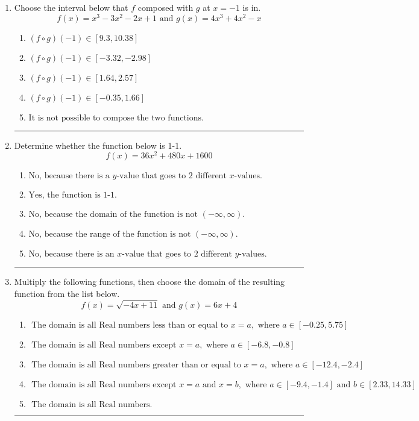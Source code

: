 \documentclass[14pt]{extbook}
\newcommand{\litem}[1]{\item#1\hspace*{-1cm}\rule{\textwidth}{0.4pt}}
\begin{document}
\begin{enumerate}
\litem{
Choose the interval below that $f$ composed with $g$ at $x=-1$ is in.\[ f(x) = x^{3} -3 x^{2} -2 x + 1 \text{ and } g(x) = 4x^{3} +4 x^{2} -x \]\begin{enumerate}[label=\Alph*.]
\item \( (f \circ g)(-1) \in [9.3, 10.38] \)
\item \( (f \circ g)(-1) \in [-3.32, -2.98] \)
\item \( (f \circ g)(-1) \in [1.64, 2.57] \)
\item \( (f \circ g)(-1) \in [-0.35, 1.66] \)
\item \( \text{It is not possible to compose the two functions.} \)

\end{enumerate} }
\litem{
Determine whether the function below is 1-1.\[ f(x) = 36 x^2 + 480 x + 1600 \]\begin{enumerate}[label=\Alph*.]
\item \( \text{No, because there is a $y$-value that goes to 2 different $x$-values.} \)
\item \( \text{Yes, the function is 1-1.} \)
\item \( \text{No, because the domain of the function is not $(-\infty, \infty)$.} \)
\item \( \text{No, because the range of the function is not $(-\infty, \infty)$.} \)
\item \( \text{No, because there is an $x$-value that goes to 2 different $y$-values.} \)

\end{enumerate} }
\litem{
Multiply the following functions, then choose the domain of the resulting function from the list below.\[ f(x) = \sqrt{-4x+11}  \text{ and } g(x) = 6x + 4 \]\begin{enumerate}[label=\Alph*.]
\item \( \text{ The domain is all Real numbers less than or equal to } x = a, \text{ where } a \in [-0.25, 5.75] \)
\item \( \text{ The domain is all Real numbers except } x = a, \text{ where } a \in [-6.8, -0.8] \)
\item \( \text{ The domain is all Real numbers greater than or equal to } x = a, \text{ where } a \in [-12.4, -2.4] \)
\item \( \text{ The domain is all Real numbers except } x = a \text{ and } x = b, \text{ where } a \in [-9.4, -1.4] \text{ and } b \in [2.33, 14.33] \)
\item \( \text{ The domain is all Real numbers. } \)


\end{enumerate}}
\end{enumerate}
\end{document}
